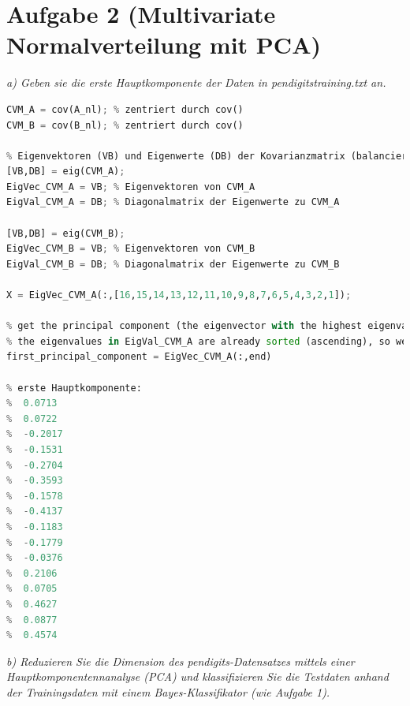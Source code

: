 \documentclass[12pt]{article}
\begin{document}
\section{Aufgabe 2 (Multivariate Normalverteilung mit PCA)}
\textit{a) Geben sie die erste Hauptkomponente der Daten in pendigits­training.txt​ an.}
\begin{lstlisting}[language=Python]
% Kovarianzmatrix
CVM_A = cov(A_nl); % zentriert durch cov()
CVM_B = cov(B_nl); % zentriert durch cov()

% Eigenvektoren (VB) und Eigenwerte (DB) der Kovarianzmatrix (balanciert)
[VB,DB] = eig(CVM_A);
EigVec_CVM_A = VB; % Eigenvektoren von CVM_A
EigVal_CVM_A = DB; % Diagonalmatrix der Eigenwerte zu CVM_A

[VB,DB] = eig(CVM_B);
EigVec_CVM_B = VB; % Eigenvektoren von CVM_B
EigVal_CVM_B = DB; % Diagonalmatrix der Eigenwerte zu CVM_B

X = EigVec_CVM_A(:,[16,15,14,13,12,11,10,9,8,7,6,5,4,3,2,1]);

% get the principal component (the eigenvector with the highest eigenvalue):
% the eigenvalues in EigVal_CVM_A are already sorted (ascending), so we can just get the last column:
first_principal_component = EigVec_CVM_A(:,end)

% erste Hauptkomponente:
%  0.0713
%  0.0722
%  -0.2017
%  -0.1531
%  -0.2704
%  -0.3593
%  -0.1578
%  -0.4137
%  -0.1183
%  -0.1779
%  -0.0376
%  0.2106
%  0.0705
%  0.4627
%  0.0877
%  0.4574
\end{lstlisting}
\newpage
\textit{b) Reduzieren Sie die Dimension des pendigits-­Datensatzes mittels einer Hauptkomponentennanalyse (PCA) und klassifizieren Sie die Testdaten anhand der Trainingsdaten mit einem Bayes­-Klassifikator (wie Aufgabe 1).}
\end{document}
